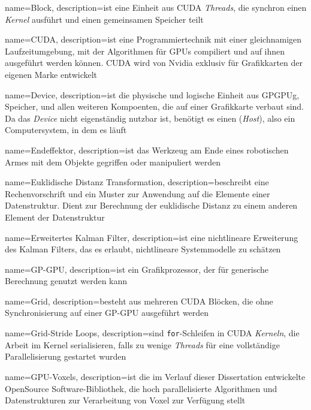 {
	name=Block,
	description={ist eine Einheit aus CUDA \textit{Threads}, die synchron einen \textit{Kernel} ausführt und einen gemeinsamen Speicher teilt}
}

{
	name=CUDA,
	description={ist eine Programmiertechnik mit einer gleichnamigen Laufzeitumgebung, mit der Algorithmen für GPUs compiliert und auf ihnen ausgeführt werden können. CUDA wird von Nvidia exklusiv für Grafikkarten der eigenen Marke entwickelt}
}

{
	name=Device,
	description={ist die physische und logische Einheit aus \Gls{GPGPUg}, Speicher, und allen weiteren Kompoenten, die auf einer Grafikkarte verbaut sind. Da das \textit{Device} nicht eigenständig nutzbar ist, benötigt es einen (\textit{Host}), also ein Computersystem, in dem es läuft}
}

{
	name=Endeffektor,
	description={ist das Werkzeug am Ende eines robotischen Armes mit dem Objekte gegriffen oder manipuliert werden}
}

{
	name=Euklidische Distanz Transformation,
	description={beschreibt eine Rechenvorschrift und ein Muster zur Anwendung auf die Elemente einer Datenstruktur. Dient zur Berechnung der euklidische Distanz zu einem anderen Element der Datenstruktur}
}

{
	name=Erweitertes Kalman Filter,
	description={ist eine nichtlineare Erweiterung des Kalman Filters, das es erlaubt, 
		nichtlineare Systemmodelle zu schätzen}
}

{
	name=GP-GPU,
	description={ist ein Grafikprozessor, der für generische Berechnung genutzt werden kann}
}

{
	name=Grid,
	description={besteht aus mehreren CUDA Blöcken, die ohne Synchronisierung auf einer GP-GPU ausgeführt werden}
}

{
	name=Grid-Stride Loops,
	description={sind \texttt{for}-Schleifen in CUDA \textit{Kerneln}, die Arbeit im Kernel serialisieren, falls zu wenige \textit{Threads} für eine vollständige Parallelisierung gestartet wurden}
}

{
	name=GPU-Voxels,
	description={ist die im Verlauf dieser Dissertation entwickelte OpenSource Software-Bibliothek, die hoch parallelisierte Algorithmen und Datenstrukturen zur Verarbeitung von Voxel zur Verfügung stellt}
}

